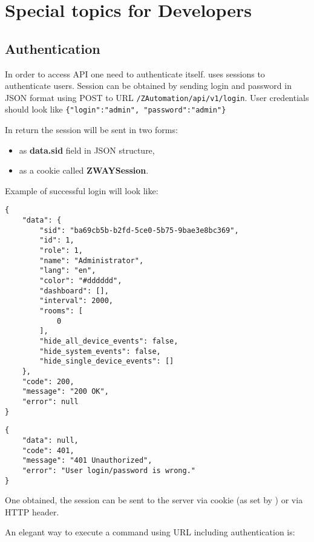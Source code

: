 \chapter{Special topics for Developers}

\section{Authentication}
\label{cap:authentication}

In order to access API one need to authenticate itself. \zway uses sessions
to authenticate users. Session can be obtained by sending login and password
in JSON format using POST to URL \texttt{/ZAutomation/api/v1/login}. User
credentials should look like \texttt{\{"login":"admin", "password":"admin"\}}

In return the session will be sent in two forms:
\begin{itemize}
\item as \textbf{data.sid} field in JSON structure,
\item as a cookie called \textbf{ZWAYSession}.
\end{itemize}

Example of successful login will look like:
\begin{lstlisting}[caption=Successful login reply]
{
    "data": {
        "sid": "ba69cb5b-b2fd-5ce0-5b75-9bae3e8bc369",
        "id": 1,
        "role": 1,
        "name": "Administrator",
        "lang": "en",
        "color": "#dddddd",
        "dashboard": [],
        "interval": 2000,
        "rooms": [
            0
        ],
        "hide_all_device_events": false,
        "hide_system_events": false,
        "hide_single_device_events": []
    },
    "code": 200,
    "message": "200 OK",
    "error": null
}
\end{lstlisting}

\begin{lstlisting}[caption=Wrong login/password reply]
{
    "data": null,
    "code": 401,
    "message": "401 Unauthorized",
    "error": "User login/password is wrong."
}
\end{lstlisting}

One obtained, the session can be sent to the server via cookie (as set by
\zway) or via HTTP header.

An elegant way to execute a command using URL including authentication is:

\begin{quote} 
\end{quote}  

